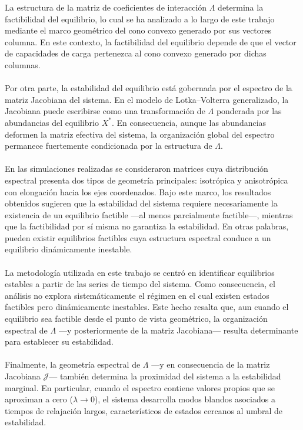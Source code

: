 La estructura de la matriz de coeficientes de interacción $\Lambda$ determina la factibilidad del equilibrio, lo cual se ha analizado a lo largo de este trabajo mediante el marco geométrico del cono convexo generado por sus vectores columna. En este contexto, la factibilidad del equilibrio depende de que el vector de capacidades de carga pertenezca al cono convexo generado por dichas columnas.
\\
\\
Por otra parte, la estabilidad del equilibrio está gobernada por el espectro de la matriz Jacobiana del sistema. En el modelo de Lotka–Volterra generalizado, la Jacobiana puede escribirse como una transformación de $\Lambda$ ponderada por las abundancias del equilibrio $X^*$. En consecuencia, aunque las abundancias deformen la matriz efectiva del sistema, la organización global del espectro permanece fuertemente condicionada por la estructura de $\Lambda$.
\\
\\
En las simulaciones realizadas se consideraron matrices cuya distribución espectral presenta dos tipos de geometría principales: isotrópica y anisotrópica con elongación hacia los ejes coordenados. Bajo este marco, los resultados obtenidos sugieren que la estabilidad del sistema requiere necesariamente la existencia de un equilibrio factible —al menos parcialmente factible—, mientras que la factibilidad por sí misma no garantiza la estabilidad. En otras palabras, pueden existir equilibrios factibles cuya estructura espectral conduce a un equilibrio dinámicamente inestable.
\\
\\
La metodología utilizada en este trabajo se centró en identificar equilibrios estables a partir de las series de tiempo del sistema. Como consecuencia, el análisis no explora sistemáticamente el régimen en el cual existen estados factibles pero dinámicamente inestables. Este hecho resalta que, aun cuando el equilibrio sea factible desde el punto de vista geométrico, la organización espectral de $\Lambda$ ---y posteriormente de la matriz Jacobiana--- resulta determinante para establecer su estabilidad.
\\
\\
Finalmente, la geometría espectral de $\Lambda$ ---y en consecuencia de la matriz Jacobiana $\mathcal{J}$--- también determina la proximidad del sistema a la estabilidad marginal. En particular, cuando el espectro contiene valores propios que se aproximan a cero ($\lambda\to0$), el sistema desarrolla modos blandos asociados a tiempos de relajación largos, característicos de estados cercanos al umbral de estabilidad.


